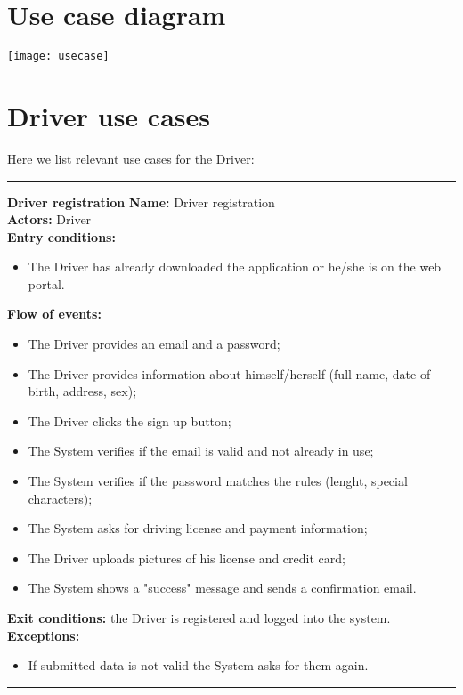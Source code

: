 \section{Use case diagram}
\texttt{[image: usecase]}
\section{Driver use cases}
Here we list relevant use cases for the Driver:\\
\begin{center}
\noindent\rule{8cm}{1.0pt}
\end{center}

\textbf{\large Driver registration}
\bigbreak
\textbf{Name:} Driver registration \\
\textbf{Actors:} Driver \\
\textbf{Entry conditions:} 
\begin{itemize}
\item The Driver has already downloaded the application or he/she is on the web portal.
\end{itemize}
\textbf{Flow of events:} 
\begin{itemize}
\item The Driver provides an email and a password;
\item The Driver provides information about himself/herself (full name, date of birth, address, sex);
\item The Driver clicks the sign up button;
\item The System verifies if the email is valid and not already in use;
\item The System verifies if the password matches the rules (lenght, special characters);
\item The System asks for driving license and payment information;
\item The Driver uploads pictures of his license and credit card;
\item The System shows a "success" message and sends a confirmation email.
\end{itemize}
\textbf{Exit conditions:} the Driver is registered and logged into the system.\\
\textbf{Exceptions:} 
\begin{itemize}
\item If submitted data is not valid the System asks for them again.
\end{itemize}

\begin{center}
\noindent\rule{8cm}{1.0pt}
\end{center}


